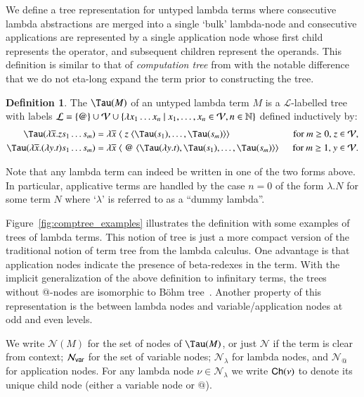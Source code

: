 \documentclass{elsarticle}
\makeatletter
\theoremstyle{plain}
\theoremstyle{definition}
\newtheorem{definition}{Definition}[section]
\newcommand\VarSet{\mathcal{V}}
\newcommand\Nodes{\mathcal{N}}%
\newcommand\NodesVar{\Nodes_{\sf var}}%
\newcommand\NodesLmd{\Nodes_\lambda}%
\newcommand\NodesApp{\Nodes_@}%
\newcommand{\child}{{\small \sf Ch}} %
\newcommand{\ctree}{\Tau} %
\makeatother
\begin{document}
We define a tree representation for untyped lambda terms where consecutive lambda abstractions are merged into a single `bulk' lambda-node and consecutive applications are represented by a single application node whose first child represents the operator, and subsequent children represent the operands.
This definition is similar to that of \emph{computation tree} from \cite{OngLics2006, BlumPhd} with the notable difference that we do not eta-long expand the term prior to constructing the tree.
\begin{definition}
The  $\ctree(M)$ of an
 untyped lambda term $M$ is a $\mathcal{L}$-labelled tree
with labels
$\mathcal{L} = \{ @ \} \union \VarSet \union \{ \lambda x_1 \ldots x_n \ | \ x_1 ,\ldots, x_n \in
    \VarSet, n\in\nat \}$
defined inductively by:
\begin{align*}
    \ctree(\lambda \overline{x} . z s_1 \ldots s_m) &= \lambda \overline{x}\; \langle\; z\; \langle \ctree(s_1),\ldots,\ctree(s_m)\rangle\rangle
&    \hbox{for $m\geq 0$, $z \in \VarSet$},
\\
\ctree(\lambda \overline{x} . (\lambda y.t) s_1 \ldots s_m) &= \lambda \overline{x}\; \langle\; @ \; \langle \ctree(\lambda y.t),\ctree(s_1),\ldots,\ctree(s_m) \rangle \rangle \enspace
&  \hbox{for $m\geq 1$, $y\in \VarSet$}.
\end{align*}

Note that any lambda term can indeed be written in one of the two forms above. In particular, applicative terms are handled by the case $n=0$ of the form $\lambda . N$ for some term $N$ where `$\lambda$' is referred to as a ``dummy lambda''.

Figure~\ref{fig:comptree_examples} illustrates the definition with some examples of trees of lambda terms.
This notion of tree is just a more compact version of the traditional notion of term tree from the lambda calculus. One advantage is that application nodes indicate the presence of beta-redexes in the term.
With the implicit generalization of the above definition to infinitary terms,
the trees without @-nodes are isomorphic to B\"ohm tree~\cite{Barendregt84}.
Another property of this representation is the  between lambda nodes and variable/application nodes at odd and even levels.

We write $\Nodes(M)$ for the set of nodes of $\ctree(M)$, or just $\Nodes$ if the term is clear from context; $\NodesVar$ for the set of variable nodes; $\NodesLmd$ for lambda nodes, and $\NodesApp$ for  application nodes. For any lambda node $\nu\in\NodesLmd$ we write $\child(\nu)$ to denote its unique child node (either a variable node or $@$).
\end{definition}
\end{document}
